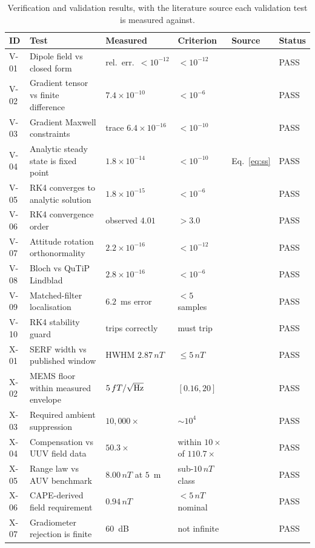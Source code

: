 \documentclass[11pt]{article}
\newcommand{\nT}{\,nT}\newcommand{\pT}{\,pT}\newcommand{\fT}{\,fT}
\begin{document}
\begin{table}[htbp]\centering\scriptsize
\begin{tabular}{p{0.8cm}p{4.4cm}p{4.0cm}p{2.8cm}p{1.9cm}p{0.9cm}}
\toprule
\textbf{ID}&\textbf{Test}&\textbf{Measured}&\textbf{Criterion}&\textbf{Source}&\textbf{Status}\\
\midrule
V-01&Dipole field vs closed form&rel.\ err.\ $<10^{-12}$&$<10^{-12}$&\cite{jackson1998}&PASS\\
V-02&Gradient tensor vs finite difference&$7.4\times10^{-10}$&$<10^{-6}$&\cite{jackson1998}&PASS\\
V-03&Gradient Maxwell constraints&trace $6.4\times10^{-16}$&$<10^{-10}$&\cite{jackson1998}&PASS\\
V-04&Analytic steady state is fixed point&$1.8\times10^{-14}$&$<10^{-10}$&Eq.~\eqref{eq:ss}&PASS\\
V-05&RK4 converges to analytic solution&$1.8\times10^{-15}$&$<10^{-6}$&\cite{butcher2016}&PASS\\
V-06&RK4 convergence order&observed $4.01$&$>3.0$&\cite{butcher2016}&PASS\\
V-07&Attitude rotation orthonormality&$2.2\times10^{-16}$&$<10^{-12}$&\cite{diebel2006}&PASS\\
V-08&Bloch vs QuTiP Lindblad&$2.8\times10^{-16}$&$<10^{-6}$&\cite{qutip2013,seltzer2008}&PASS\\
V-09&Matched-filter localisation&$6.2$~ms error&$<5$ samples&\cite{vantrees2001}&PASS\\
V-10&RK4 stability guard&trips correctly&must trip&\cite{butcher2016}&PASS\\
\midrule
X-01&SERF width vs published window&HWHM $2.87\nT$&$\leq5\nT$&\cite{borna2022}&PASS\\
X-02&MEMS floor within measured envelope&$5\fT/\sqrt{\rm Hz}$&$[0.16,20]$&\cite{griffith2010,dang2010,allred2002}&PASS\\
X-03&Required ambient suppression&$10{,}000\times$&$\sim10^{4}$&\cite{ncei,borna2022}&PASS\\
X-04&Compensation vs UUV field data&$50.3\times$&within $10\times$ of $110.7\times$&\cite{oehler2024}&PASS\\
X-05&Range law vs AUV benchmark&$8.00\nT$ at $5$~m&sub-$10\nT$ class&\cite{oehler2024,seidel2023}&PASS\\
X-06&CAPE-derived field requirement&$0.94\nT$&$<5\nT$ nominal&\cite{borna2022}&PASS\\
X-07&Gradiometer rejection is finite&$60$~dB&not infinite&\cite{oehler2024}&PASS\\
\bottomrule
\end{tabular}
\caption{Verification and validation results, with the literature source each
validation test is measured against.}\label{tab:vv}
\end{table}
\end{document}
